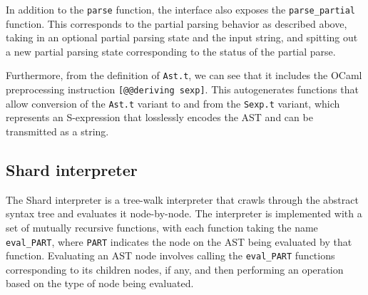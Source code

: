 \documentclass[oneside]{report}
\begin{document}
In addition to the \texttt{parse} function, the interface also exposes the \texttt{parse\_partial} function. This corresponds to the partial parsing behavior as described above, taking in an optional partial parsing state and the input string, and spitting out a new partial parsing state corresponding to the status of the partial parse.

Furthermore, from the definition of \texttt{Ast.t}, we can see that it includes the OCaml preprocessing instruction \texttt{[@@deriving sexp]}. This autogenerates functions that allow conversion of the \texttt{Ast.t} variant to and from the \texttt{Sexp.t} variant, which represents an S-expression that losslessly encodes the AST and can be transmitted as a string.

\subsection{Shard interpreter}

The Shard interpreter is a tree-walk interpreter that crawls through the abstract syntax tree and evaluates it node-by-node.
The interpreter is implemented with a set of mutually recursive functions, with each function taking the name \texttt{eval\_PART}, where \texttt{PART} indicates the node on the AST being evaluated by that function.
Evaluating an AST node involves calling the \texttt{eval\_PART} functions corresponding to its children nodes, if any, and then performing an operation based on the type of node being evaluated.





\end{document}
